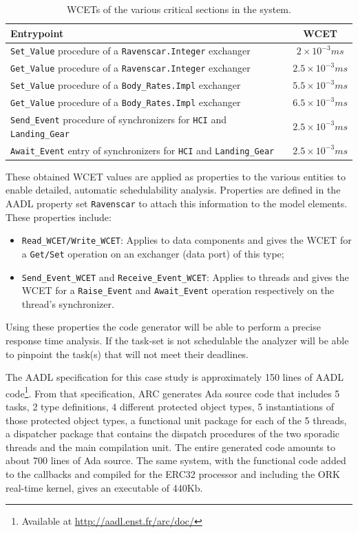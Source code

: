 \begin{table}
\centering
\begin{tabular}{|l|c|}
\hline
\textbf{Entrypoint} & \textbf{WCET}\\
\hline
\texttt{Set\_Value} procedure of a \texttt{Ravenscar.Integer}
exchanger & $2\times 10^{-3} ms$\\
\texttt{Get\_Value} procedure of a \texttt{Ravenscar.Integer}
exchanger & $2.5\times 10^{-3} ms$\\
\texttt{Set\_Value} procedure of a \texttt{Body\_Rates.Impl} exchanger
& $5.5\times 10^{-3} ms$\\
\texttt{Get\_Value} procedure of a \texttt{Body\_Rates.Impl} exchanger
& $6.5\times 10^{-3} ms$\\
\texttt{Send\_Event} procedure of synchronizers for \texttt{HCI} and
\texttt{Landing\_Gear} & $2.5\times 10^{-3} ms$\\
\texttt{Await\_Event} entry of synchronizers for \texttt{HCI} and
\texttt{Landing\_Gear} & $2.5\times 10^{-3} ms$\\
\hline
\end{tabular}
\caption{WCETs of the various critical sections in the system.}
\label{tab:wcets}
\end{table}

These obtained WCET values are applied as properties to the various
\aadl entities to enable detailed, automatic schedulability
analysis. Properties are defined in the AADL property set
\texttt{Ravenscar} to attach this information to the model elements.
These properties include:

\begin{itemize}
\item{\texttt{Read\_WCET/Write\_WCET}: Applies to data components and
  gives the WCET for a \texttt{Get/Set} operation on an exchanger
  (data port) of this type;}
\item{\texttt{Send\_Event\_WCET} and \texttt{Receive\_Event\_WCET}:
  Applies to threads and gives the WCET for a \texttt{Raise\_Event}
  and \texttt{Await\_Event} operation respectively on the thread's
  synchronizer.}
\end{itemize}

Using these properties the code generator will be able to perform a
precise response time analysis. If the task-set is not schedulable the
analyzer will be able to pinpoint the task(s) that will not meet their
deadlines.

The AADL specification for this case study is approximately 150 lines
of AADL code\footnote{Available at
  \url{http://aadl.enst.fr/arc/doc/}}. From that specification, ARC
generates Ada source code that includes 5 tasks, 2 type definitions, 4
different protected object types, 5 instantiations of those protected
object types, a functional unit package for each of the 5 threads, a
dispatcher package that contains the dispatch procedures of the two
sporadic threads and the main compilation unit. The entire generated
code amounts to about 700 lines of Ada source. The same system, with
the functional code added to the callbacks and compiled for the ERC32
processor and including the ORK real-time kernel, gives an executable
of 440Kb.

